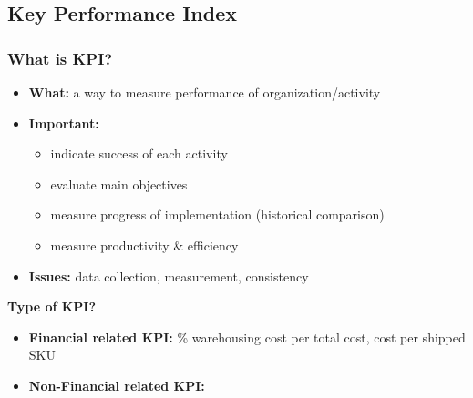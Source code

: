 \documentclass[10pt,handout,notes=show]{beamer}
\begin{document}
\subsection[KPI]{Key Performance Index}
\begin{frame}
  \frametitle{What is KPI?}

  \begin{itemize}
    \item \textbf{What:} a way to measure performance of organization/activity
    \item \textbf{Important:}
    \begin{itemize}
      \item indicate success of each activity
      \item evaluate main objectives
      \item measure progress of implementation (historical comparison)
      \item measure productivity \& efficiency  \NextHalfLine
    \end{itemize}
    \item \textbf{Issues:} data collection, measurement, \alert{consistency}
  \end{itemize}

  \NextLine
  \textbf{Type of KPI?}
  \begin{itemize}
    \item \textbf{Financial related KPI:} \% warehousing cost per total cost, cost per shipped SKU
    \item \textbf{Non-Financial related KPI:}
   \end{itemize}

  \end{frame}
\end{document}
